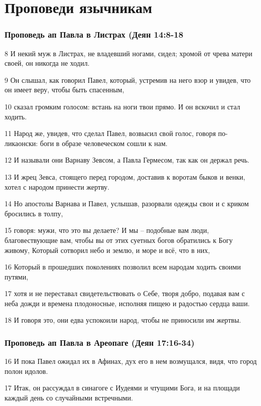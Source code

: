 \chapter{Проповеди язычникам}
\label{cha:appendix2}

\subsection*{Проповедь ап Павла в Листрах (Деян 14:8-18}
8 И некий муж в Листрах, не владевший ногами, сидел; хромой от чрева матери своей, он никогда не ходил.

9 Он слышал, как говорил Павел, который, устремив на него взор и увидев, что он имеет веру, чтобы быть спасенным,

10 сказал громким голосом: встань на ноги твои прямо. И он вскочил и стал ходить.

11 Народ же, увидев, что сделал Павел, возвысил свой голос, говоря по-ликаонски: боги в образе человеческом сошли к нам.

12 И называли они Варнаву Зевсом, а Павла Гермесом, так как он держал речь.

13 И жрец Зевса, стоящего перед городом, доставив к воротам быков и венки, хотел с народом принести жертву.

14 Но апостолы Варнава и Павел, услышав, разорвали одежды свои и с криком бросились в толпу,

15 говоря: мужи, что это вы делаете? И мы – подобные вам люди, благовествующие вам, чтобы вы от этих суетных богов обратились к Богу живому, Который сотворил небо и землю, и море и всё, что в них,

16 Который в прошедших поколениях позволил всем народам ходить своими путями,

17 хотя и не переставал свидетельствовать о Себе, творя добро, подавая вам с неба дожди и времена плодоносные, исполняя пищею и радостью сердца ваши.

18 И говоря это, они едва успокоили народ, чтобы не приносили им жертвы.

\subsection*{Проповедь ап Павла в Ареопаге (Деян 17:16-34)}
16 И пока Павел ожидал их в Афинах, дух его в нем возмущался, видя, что город полон идолов.

17 Итак, он рассуждал в синагоге с Иудеями и чтущими Бога, и на площади каждый день со случайными встречными.

